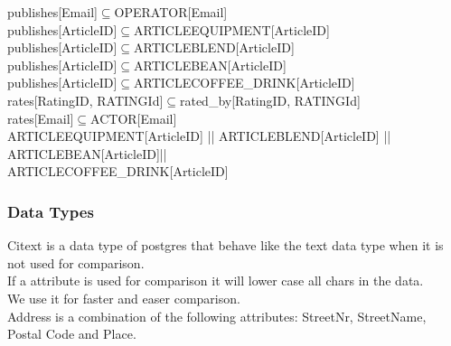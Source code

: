 publishes[Email]$\subseteq$OPERATOR[Email]\\
publishes[ArticleID]$\subseteq$ARTICLEEQUIPMENT[ArticleID]\\
publishes[ArticleID]$\subseteq$ARTICLEBLEND[ArticleID]\\
publishes[ArticleID]$\subseteq$ARTICLEBEAN[ArticleID]\\
publishes[ArticleID]$\subseteq$ARTICLECOFFEE\_DRINK[ArticleID]\\
rates[RatingID, RATINGId]$\subseteq$rated\_by[RatingID, RATINGId]\\
rates[Email]$\subseteq$ACTOR[Email]\\
ARTICLEEQUIPMENT[ArticleID] || ARTICLEBLEND[ArticleID] || ARTICLEBEAN[ArticleID]|| \\
ARTICLECOFFEE\_DRINK[ArticleID]\\
\subsubsection{Data Types}
Citext is a data type of postgres that behave like the text data type when it is not used for comparison.\\
If a attribute is used for comparison it will lower case all chars in the data.\\
We use it for faster and easer comparison.\\
Address is a combination of the following attributes: StreetNr, StreetName, Postal Code and Place.\\\\

